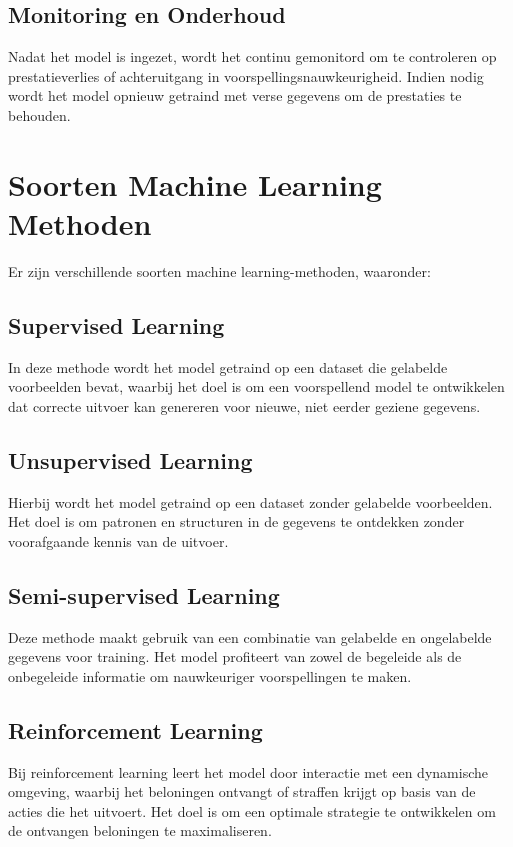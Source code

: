 \subsection{Monitoring en Onderhoud}
Nadat het model is ingezet, wordt het continu gemonitord om te controleren op prestatieverlies of achteruitgang in voorspellingsnauwkeurigheid. Indien nodig wordt het model opnieuw getraind met verse gegevens om de prestaties te behouden.

\section{Soorten Machine Learning Methoden}

Er zijn verschillende soorten machine learning-methoden, waaronder:

\subsection{Supervised Learning}
In deze methode wordt het model getraind op een dataset die gelabelde voorbeelden bevat, waarbij het doel is om een voorspellend model te ontwikkelen dat correcte uitvoer kan genereren voor nieuwe, niet eerder geziene gegevens.

\subsection{Unsupervised Learning}
Hierbij wordt het model getraind op een dataset zonder gelabelde voorbeelden. Het doel is om patronen en structuren in de gegevens te ontdekken zonder voorafgaande kennis van de uitvoer.

\subsection{Semi-supervised Learning}
Deze methode maakt gebruik van een combinatie van gelabelde en ongelabelde gegevens voor training. Het model profiteert van zowel de begeleide als de onbegeleide informatie om nauwkeuriger voorspellingen te maken.

\subsection{Reinforcement Learning}
Bij reinforcement learning leert het model door interactie met een dynamische omgeving, waarbij het beloningen ontvangt of straffen krijgt op basis van de acties die het uitvoert. Het doel is om een optimale strategie te ontwikkelen om de ontvangen beloningen te maximaliseren.

